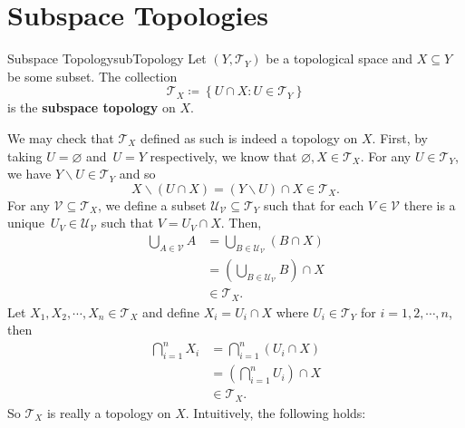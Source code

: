 \documentclass[math, code]{amznotes}
\theoremstyle{remark}
\begin{document}
\section{Subspace Topologies}
\begin{dfnbox}{Subspace Topology}{subTopology}
    Let $\left(Y, \mathcal{T}_Y\right)$ be a topological space and $X \subseteq Y$ be some subset. The collection
    \begin{equation*}
        \mathcal{T}_X \coloneqq \left\{U \cap X \colon U \in \mathcal{T}_Y\right\}
    \end{equation*}
    is the {\color{red} \textbf{subspace topology}} on $X$.
\end{dfnbox}
We may check that $\mathcal{T}_X$ defined as such is indeed a topology on $X$. First, by taking $U = \varnothing$ and~$U = Y$ respectively, we know that $\varnothing, X \in \mathcal{T}_X$. For any $U \in \mathcal{T}_Y$, we have $Y \backslash U \in \mathcal{T}_Y$ and so 
\begin{equation*}
    X \backslash \left(U \cap X\right) = \left(Y \backslash U\right) \cap X \in \mathcal{T}_X.
\end{equation*}
For any $\mathcal{V} \subseteq \mathcal{T}_X$, we define a subset $\mathcal{U_{\mathcal{V}}} \subseteq \mathcal{T}_Y$ such that for each $V \in \mathcal{V}$ there is a unique~$U_V \in \mathcal{U}_{\mathcal{V}}$ such that $V = U_V \cap X$. Then, 
\begin{align*}
    \bigcup_{A \in \mathcal{V}}A & = \bigcup_{B \in \mathcal{U}_{\mathcal{V}}}\left(B \cap X\right) \\
    & = \left(\bigcup_{B \in \mathcal{U}_{\mathcal{V}}}B\right) \cap X \\
    & \in \mathcal{T}_X.
\end{align*}
Let $X_1, X_2, \cdots, X_n \in \mathcal{T}_X$ and define $X_i = U_i \cap X$ where $U_i \in \mathcal{T}_Y$ for $i = 1, 2, \cdots, n$, then 
\begin{align*}
    \bigcap_{i = 1}^nX_i & = \bigcap_{i = 1}^n\left(U_i \cap X\right) \\
    & = \left(\bigcap_{i = 1}^nU_i\right) \cap X \\
    & \in \mathcal{T}_X.
\end{align*}
So $\mathcal{T}_X$ is really a topology on $X$. Intuitively, the following holds:
\end{document}
